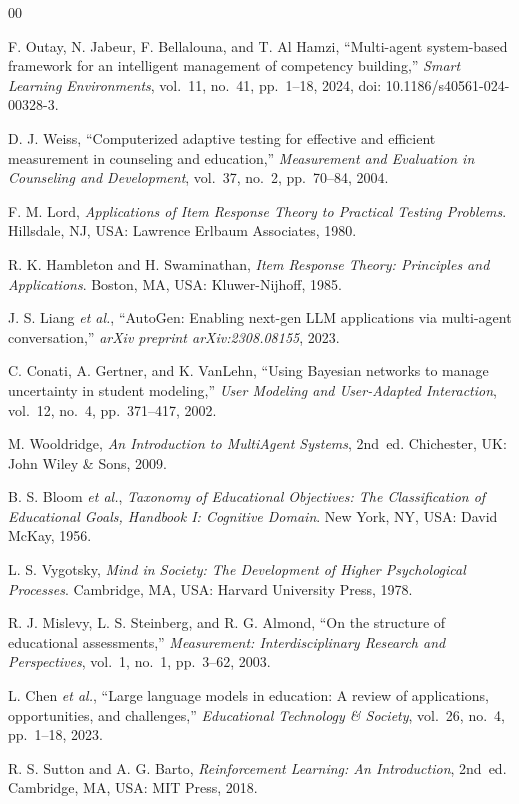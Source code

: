 \documentclass[conference]{IEEEtran}
\begin{document}
\begin{thebibliography}{00}

F. Outay, N. Jabeur, F. Bellalouna, and T. Al Hamzi,
``Multi-agent system-based framework for an intelligent management of competency building,''
\textit{Smart Learning Environments}, vol.~11, no.~41, pp.~1--18, 2024,
doi: 10.1186/s40561-024-00328-3.

D. J. Weiss,
``Computerized adaptive testing for effective and efficient measurement in counseling and education,''
\textit{Measurement and Evaluation in Counseling and Development},
vol.~37, no.~2, pp.~70--84, 2004.

F. M. Lord,
\textit{Applications of Item Response Theory to Practical Testing Problems}.
Hillsdale, NJ, USA: Lawrence Erlbaum Associates, 1980.

R. K. Hambleton and H. Swaminathan,
\textit{Item Response Theory: Principles and Applications}.
Boston, MA, USA: Kluwer-Nijhoff, 1985.

J. S. Liang \textit{et al.},
``AutoGen: Enabling next-gen LLM applications via multi-agent conversation,''
\textit{arXiv preprint arXiv:2308.08155}, 2023.

C. Conati, A. Gertner, and K. VanLehn,
``Using Bayesian networks to manage uncertainty in student modeling,''
\textit{User Modeling and User-Adapted Interaction},
vol.~12, no.~4, pp.~371--417, 2002.

M. Wooldridge,
\textit{An Introduction to MultiAgent Systems}, 2nd~ed.
Chichester, UK: John Wiley \& Sons, 2009.

B. S. Bloom \textit{et al.},
\textit{Taxonomy of Educational Objectives: The Classification of Educational Goals, Handbook I: Cognitive Domain}.
New York, NY, USA: David McKay, 1956.

L. S. Vygotsky,
\textit{Mind in Society: The Development of Higher Psychological Processes}.
Cambridge, MA, USA: Harvard University Press, 1978.

R. J. Mislevy, L. S. Steinberg, and R. G. Almond,
``On the structure of educational assessments,''
\textit{Measurement: Interdisciplinary Research and Perspectives},
vol.~1, no.~1, pp.~3--62, 2003.

L. Chen \textit{et al.},
``Large language models in education: A review of applications, opportunities, and challenges,''
\textit{Educational Technology \& Society}, vol.~26, no.~4, pp.~1--18, 2023.

R. S. Sutton and A. G. Barto,
\textit{Reinforcement Learning: An Introduction}, 2nd~ed.
Cambridge, MA, USA: MIT Press, 2018.

\end{thebibliography}
\end{document}

